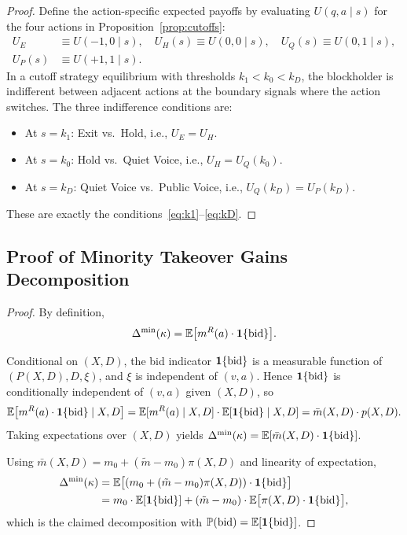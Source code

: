 \documentclass[11pt]{article}
\newcommand{\E}{\mathbb{E}}
\newcommand{\PP}{\mathbb{P}}
\newcommand{\1}{\mathbf{1}}
\begin{document}
\begin{proof}
  Define the action-specific expected payoffs by evaluating $U(q,a \mid s)$ for the four actions in Proposition~\ref{prop:cutoffs}:
  \begin{align*}
  U_E &\equiv U(-1,0 \mid s), \quad U_H(s)\equiv U(0,0 \mid s), \quad U_Q(s)\equiv U(0,1 \mid s), \\
  U_P(s) &\equiv U(+1,1 \mid s).
  \end{align*}
In a cutoff strategy equilibrium with thresholds $k_1<k_0<k_D$, the blockholder is indifferent between adjacent actions at the boundary signals where the action switches. The three indifference conditions are:
\begin{itemize}[leftmargin=1.5em,itemsep=0pt]
\item At $s = k_1$: Exit vs.\ Hold, i.e., $U_E = U_H$.
\item At $s = k_0$: Hold vs.\ Quiet Voice, i.e., $U_H = U_Q(k_0)$.
\item At $s = k_D$: Quiet Voice vs.\ Public Voice, i.e., $U_Q(k_D) = U_P(k_D)$.
\end{itemize}
These are exactly the conditions~\eqref{eq:k1}--\eqref{eq:kD}.
\end{proof}

\subsection{Proof of Minority Takeover Gains Decomposition}
\label{app:proof-minority-decomp}

\begin{proof}
  By definition,
  \[
  \Delta^{\min}(\kappa)=\E\big[m^{R}(a)\cdot \1\{\textup{bid}\}\big].
  \]

    Conditional on $(X,D)$, the bid indicator $\1\{\textup{bid}\}$ is a measurable function of $(P(X,D),D,\xi)$, and $\xi$ is independent of $(v,a)$. Hence $\1\{\textup{bid}\}$ is conditionally independent of $(v,a)$ given $(X,D)$, so
    \[
    \E\big[m^{R}(a)\cdot \1\{\textup{bid}\} \mid X,D\big]
    =\E[m^{R}(a) \mid X,D]\cdot \E[\1\{\textup{bid}\} \mid X,D]
    =\bar{m}(X,D)\cdot p(X,D).
    \]
  Taking expectations over $(X,D)$ yields $\Delta^{\min}(\kappa)=\E[\bar{m}(X,D)\cdot \1\{\textup{bid}\}]$.

  Using $\bar{m}(X,D)=m_0+(\tilde{m}-m_0)\pi(X,D)$ and linearity of expectation,
  \begin{align*}
  \Delta^{\min}(\kappa)
  &=\E\big[(m_0+(\tilde{m}-m_0)\pi(X,D))\cdot \1\{\textup{bid}\}\big] \\
  &=m_0\cdot \E[\1\{\textup{bid}\}] + (\tilde{m}-m_0)\cdot \E\big[\pi(X,D)\cdot \1\{\textup{bid}\}\big],
  \end{align*}
  which is the claimed decomposition with $\PP(\textup{bid})=\E[\1\{\textup{bid}\}]$.
\end{proof}
\end{document}
